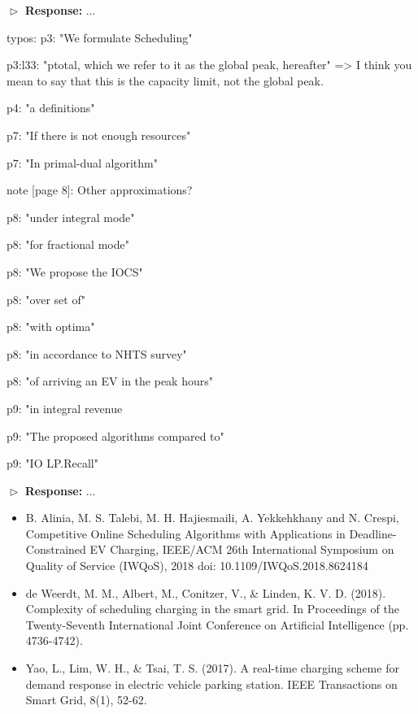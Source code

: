 \documentclass[11pt]{article}
\begin{document}
$\vartriangleright$ \noindent\textbf{Response:} 
...

\vspace{3mm}
{\color{blue} typos:
p3: "We formulate Scheduling"

p3:l33: "ptotal, which we refer to it as the global peak, hereafter" => I think you mean to say that this is the capacity limit, not the global peak.

p4: "a definitions"

p7: "If there is not enough resources"

p7: "In primal-dual algorithm"

note [page 8]: Other approximations?

p8: "under integral mode"

p8: "for fractional mode"

p8: "We propose the IOCS"

p8: "over set of"

p8: "with optima"

p8: "in accordance to NHTS survey"

p8: "of arriving an EV in the peak hours"

p9: "in integral revenue

p9: "The proposed algorithms compared to"

p9: "IO LP.Recall"
 }
\vspace{3mm}

$\vartriangleright$ \noindent\textbf{Response:} 
...


\begin{itemize}
\item B. Alinia, M. S. Talebi, M. H. Hajiesmaili, A. Yekkehkhany and N. Crespi, Competitive Online Scheduling Algorithms with Applications in Deadline-Constrained EV Charging, IEEE/ACM 26th International Symposium on Quality of Service (IWQoS), 2018
doi: 10.1109/IWQoS.2018.8624184

\item de Weerdt, M. M., Albert, M., Conitzer, V., \& Linden, K. V. D. (2018). Complexity of scheduling charging in the smart grid. In Proceedings of the Twenty-Seventh International Joint Conference on Artificial Intelligence (pp. 4736-4742).

\item Yao, L., Lim, W. H., \& Tsai, T. S. (2017). A real-time charging scheme for demand response in electric vehicle parking station. IEEE Transactions on Smart Grid, 8(1), 52-62.
\end{itemize}
\end{document}
